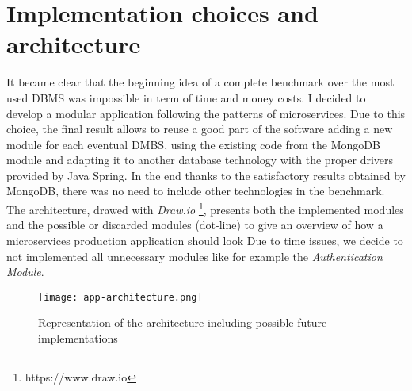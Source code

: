 \section{Implementation choices and architecture}
\label{sec:2}
It became clear that the beginning idea of a complete benchmark over the most used DBMS was impossible in term of time and money costs.
I decided to develop a modular application following the patterns of microservices. Due to this choice, the final result allows to reuse a good part of the software  adding a new module for each eventual DMBS, using the existing code from the MongoDB module and adapting it to another database technology with the proper drivers provided by Java Spring.
In the end thanks to the satisfactory results obtained by MongoDB, there was no need to include other technologies in the benchmark.
The architecture, drawed with \textit{Draw.io} \footnote{https://www.draw.io}, presents  both the implemented modules and the possible or discarded modules (dot-line) to give an overview of how a microservices production application should look
Due to time issues, we decide to not implemented all unnecessary modules like for example the \textit{Authentication Module}.
\begin{figure}
\texttt{[image: app-architecture.png]}
\centering
\caption{Representation of the architecture including possible future implementations}
\end{figure}



